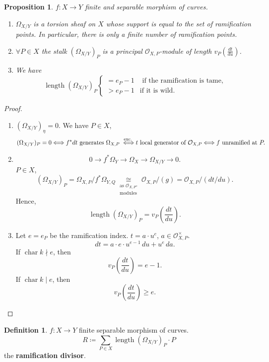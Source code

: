 \documentclass[12pt]{article}
\DeclareMathOperator{\chara}{char}
\DeclareMathOperator{\length}{length}
\newtheorem*{proposition}{Proposition}
\theoremstyle{definition}
\newtheorem*{definition}{Definition}
\theoremstyle{remark}
\begin{document}
\begin{proposition}
$f:X\rightarrow Y$ finite and separable morphism of curves.

\begin{enumerate}[label=\arabic*)]
\item $\Omega_{X/Y}$ is a torsion sheaf on $X$ whose support is equal to the set of ramification points. In particular, there is only a finite number of ramification points.

\item $\forall P\in X$ the stalk $(\Omega_{X/Y})_P$ is a principal $\mathcal{O}_{X,P}$-module of length $v_P(\frac{dt}{du})$.

\item We have
\[\length(\Omega_{X/Y})_P\left\{\begin{array}{ll}=e_P-1&\text{ if the ramification is tame,}\\>e_P-1&\text{if it is wild}.\end{array}\right.\]
\end{enumerate}
\end{proposition}

\begin{proof}
\begin{enumerate}[label=\arabic*)]
\item $(\Omega_{X/Y})_{\eta}=0$. We have $P\in X$,
\[(\Omega_{X/Y})_P=0\Longleftrightarrow f^*dt\text{ generates }\Omega_{X,P}\overset{\text{exc.}}{\vphantom{a}\Longleftrightarrow}t\text{ local generator of }\mathcal{O}_{X,P}\Longleftrightarrow f\text{ unramified at }P.\]

\item
\[0\longrightarrow f^*\Omega_Y\longrightarrow\Omega_X\longrightarrow\Omega_{X/Y}\longrightarrow0.\]
$P\in X$,
\[(\Omega_{X/Y})_P=\Omega_{X,P}/f^*\Omega_{Y,Q}\underset{\substack{\text{as }\mathcal{O}_{X,P}\text{-}\\\text{modules}}}{\cong}\mathcal{O}_{X,P}/(g)=\mathcal{O}_{X,P}/(dt/du).\]
Hence,
\[\length(\Omega_{X/Y})_P=v_P\left(\frac{dt}{du}\right).\]

\item Let $e=e_P$ be the ramification index. $t=a\cdot u^e$, $a\in\mathcal{O}_{X,P}^{\times}$.
\[dt=a\cdot e\cdot u^{e-1}\,du+u^e\,da.\]
If $\chara k\nmid e$, then
\[v_P\left(\frac{dt}{du}\right)=e-1.\]
If $\chara k\mid e$, then
\[v_P\left(\frac{dt}{du}\right)\geq e.\]
\end{enumerate}
\end{proof}

\begin{definition}
$f:X\rightarrow Y$ finite separable morphism of curves.
\[R\coloneqq\sum_{P\in X}\length(\Omega_{X/Y})_P\cdot P\]
the \textbf{ramification divisor}.
\end{definition}
\end{document}

